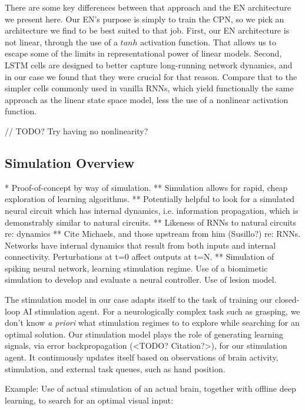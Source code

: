 \documentclass[12pt]{iopart}
\begin{document}
There are some key differences between that approach and the EN architecture we
present here. Our EN's purpose is simply to train the CPN, so we pick an
architecture we find to be best suited to that job. First, our EN architecture
is not linear, through the use of a $tanh$ activation function. That allows us
to escape some of the limits in representational power of linear models.
Second, LSTM cells are designed to better capture long-running network
dynamics, and in our case we found that they were crucial for that reason.
Compare that to the simpler cells commonly used in vanilla RNNs, which
yield functionally the same approach as the linear state space model, less
the use of a nonlinear activation function.

// TODO? Try having no nonlinearity?

\subsection{Simulation Overview}
* Proof-of-concept by way of simulation.
** Simulation allows for rapid, cheap exploration of learning algorithms.
** Potentially helpful to look for a simulated neural circuit which has internal dynamics, i.e. information propagation, which is demonstrably similar to natural circuits.
** \cite{kao.sim} Likeness of RNNs to natural circuits re: dynamics
** Cite Michaels, and those upstream from him (Susillo?) re: RNNs. Networks have internal dynamics that result from both inputs and internal connectivity. Perturbations at t=0 affect outputs at t=N.
** \cite{bernal.sim} Simulation of spiking neural network, learning stimulation regime. Use of a biomimetic
  simulation to develop and evaluate a neural controller. Use of lesion model.

The stimulation model in our case adapts itself to the task of training our closed-
loop AI stimulation agent. For a neurologically complex task such as grasping, we
don't know \textit{a priori} what stimulation regimes to to explore while searching
for an optimal solution. Our stimulation model plays the role of generating learning
signals, via error backpropagation (<TODO? Citation?>), for our stimulation agent.
It continuously updates itself based on observations of brain activity, stimulation,
and external task queues, such as hand position.

Example: Use of actual stimulation of an actual brain, together with offline deep learning,
to search for an optimal visual input: \cite{walker.inception}
\end{document}
